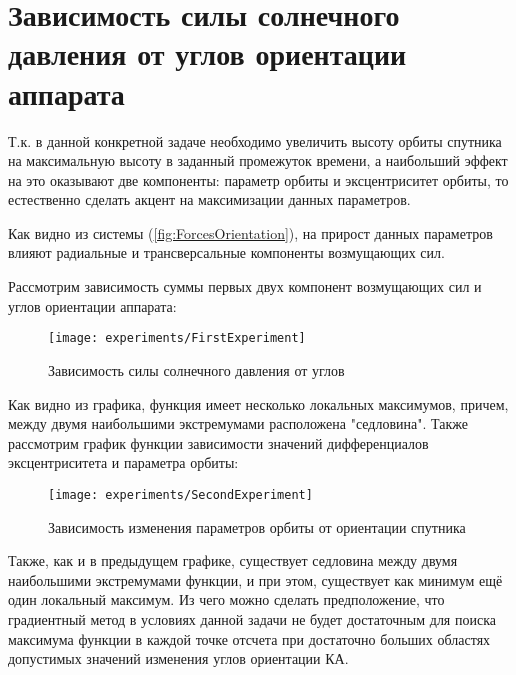 \section{Зависимость силы солнечного давления от углов ориентации аппарата}
\noindent\indent Т.к. в данной конкретной задаче необходимо увеличить высоту орбиты
спутника на максимальную высоту в заданный промежуток времени, а наибольший эффект
на это оказывают две компоненты: параметр орбиты и эксцентриситет орбиты, то естественно
сделать акцент на максимизации данных параметров.\par
    Как видно из системы (\ref{fig:ForcesOrientation}), на прирост данных параметров
влияют радиальные и трансверсальные компоненты возмущающих сил.\par
    Рассмотрим зависимость суммы первых двух компонент возмущающих сил и углов ориентации аппарата:
\begin{figure}[h]
  \centering
  \texttt{[image: experiments/FirstExperiment]}
  \caption{Зависимость силы солнечного давления от углов}
  \label{fig:Force2Angles}
\end{figure}\par
    Как видно из графика, функция имеет несколько локальных максимумов, причем,
между двумя наибольшими экстремумами расположена "седловина". Также
рассмотрим график функции зависимости значений дифференциалов эксцентриситета и
параметра орбиты:
\begin{figure}[h]
  \centering
  \texttt{[image: experiments/SecondExperiment]}
  \caption{Зависимость изменения параметров орбиты от ориентации спутника}
  \label{fig:KeplerParams2Angles}
\end{figure}\par
    Также, как и в предыдущем графике, существует седловина между двумя наибольшими
экстремумами функции, и при этом, существует как минимум ещё один локальный максимум.
    Из чего можно сделать предположение, что градиентный метод в условиях данной
задачи не будет достаточным для поиска максимума функции в каждой точке отсчета
при достаточно больших областях допустимых значений изменения углов ориентации КА.
